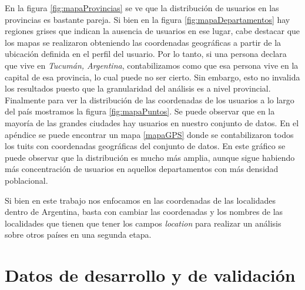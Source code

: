 En la figura \ref{fig:mapaProvincias} se ve que la distribución de usuarios en las provincias es bastante pareja. Si bien en la figura \ref{fig:mapaDepartamentos} hay regiones grises que indican la ausencia de usuarios en ese lugar, cabe destacar que los mapas se realizaron obteniendo las coordenadas geográficas a partir de la ubicación definida en el perfil del usuario. Por lo tanto, si una persona declara que vive en \textit{Tucumán, Argentina}, contabilizamos como que esa persona vive en la capital de esa provincia, lo cual puede no ser cierto. Sin embargo, esto no invalida los resultados puesto que la granularidad del análisis es a nivel provincial. Finalmente para ver la distribución de las coordenadas de los usuarios a lo largo del país mostramos la figura \ref{fig:mapaPuntos}. Se puede observar que en la mayoría de las grandes ciudades hay usuarios en nuestro conjunto de datos. En el apéndice se puede encontrar un mapa \ref{mapaGPS} donde se contabilizaron todos los tuits con coordenadas geográficas del conjunto de datos. En este gráfico se puede observar que la distribución es mucho más amplia, aunque sigue habiendo más concentración de usuarios en aquellos departamentos con más densidad poblacional.

Si bien en este trabajo nos enfocamos en las coordenadas de las localidades dentro de Argentina, basta con cambiar las coordenadas y los nombres de las localidades que tienen que tener los campos \textit{location} para realizar un análisis sobre otros países en una segunda etapa.


\section{Datos de desarrollo y de validación}

